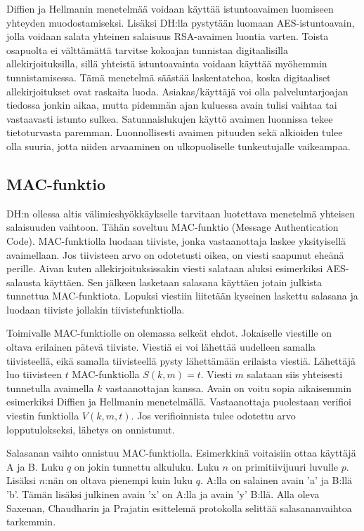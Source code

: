 \documentclass[finnish]{tktltiki2}
\theoremstyle{definition}
\theoremstyle{remark}
\begin{document}
Diffien ja Hellmanin menetelmää voidaan käyttää istuntoavaimen luomiseen yhteyden muodostamiseksi. Lisäksi DH:lla pystytään luomaan AES-istuntoavain, jolla voidaan salata yhteinen salaisuus RSA-avaimen luontia varten. Toista osapuolta ei välttämättä tarvitse kokoajan tunnistaa digitaalisilla allekirjoituksilla, sillä yhteistä istuntoavainta voidaan käyttää myöhemmin tunnistamisessa. Tämä menetelmä säästää laskentatehoa, koska digitaaliset allekirjoitukset ovat raskaita luoda. Asiakas/käyttäjä voi olla palveluntarjoajan tiedossa jonkin aikaa, mutta pidemmän ajan kuluessa avain tulisi vaihtaa tai vastaavasti istunto sulkea. Satunnaislukujen käyttö avaimen luonnissa tekee tietoturvasta paremman. Luonnollisesti avaimen pituuden sekä alkioiden tulee olla suuria, jotta niiden arvaaminen on ulkopuoliselle tunkeutujalle vaikeampaa. \cite{enti}

\subsection{MAC-funktio}

DH:n ollessa altis välimieshyökkäykselle tarvitaan luotettava menetelmä yhteisen salaisuuden vaihtoon. Tähän soveltuu MAC-funktio (Message Authentication Code). MAC-funktiolla luodaan tiiviste, jonka vastaanottaja laskee yksityisellä avaimellaan. Jos tiivisteen arvo on odotetusti oikea, on viesti saapunut eheänä perille. Aivan kuten allekirjoituksissakin viesti salataan aluksi esimerkiksi AES-salausta käyttäen. Sen jälkeen lasketaan salasana käyttäen jotain julkista tunnettua MAC-funktiota. Lopuksi viestiin liitetään kyseinen laskettu salasana ja luodaan tiiviste jollakin tiivistefunktiolla.

Toimivalle MAC-funktiolle on olemassa selkeät ehdot. Jokaiselle viestille on oltava erilainen pätevä tiiviste. Viestiä ei voi lähettää uudelleen samalla tiivisteellä, eikä samalla tiivisteellä pysty lähettämään erilaista viestiä. Lähettäjä luo tiivisteen $t$ MAC-funktiolla $S(k,m) = t$. Viesti $m$ salataan siis yhteisesti tunnetulla avaimella $k$ vastaanottajan kanssa. Avain on voitu sopia aikaisemmin esimerkiksi Diffien ja Hellmanin menetelmällä. Vastaanottaja puolestaan verifioi viestin funktiolla $V(k, m, t)$. Jos verifioinnista tulee odotettu arvo lopputulokseksi, lähetys on onnistunut. \cite{MACA} 
 
Salasanan vaihto onnistuu MAC-funktiolla. Esimerkkinä voitaisiin ottaa käyttäjä A ja B. Luku $q$ on jokin tunnettu alkuluku. Luku $n$ on primitiivijuuri luvulle $p$. Lisäksi $n$:nän on oltava pienempi kuin luku $q$. A:lla on salainen avain 'a' ja B:llä 'b'. Tämän lisäksi julkinen avain 'x' on A:lla ja avain 'y' B:llä. Alla oleva Saxenan, Chaudharin ja Prajatin \cite{MAC} esittelemä protokolla selittää salasananvaihtoa tarkemmin.
\end{document}
